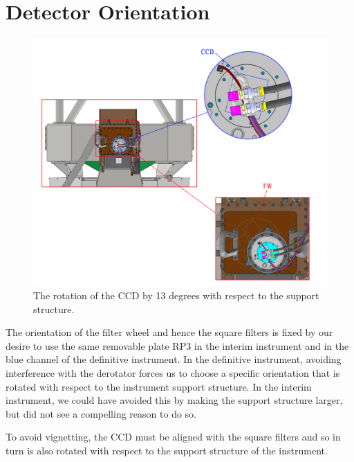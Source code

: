 \documentclass{article}
\begin{document}

\clearpage
\section{Detector Orientation}

\begin{figure}[bp]
\begin{center}
\includegraphics[width=\linewidth]{newfigures/CCD-Orientation.png}
\end{center}
\caption{The rotation of the CCD by 13 degrees with respect to the support structure.}
\label{figure:ccd-rotation}
\end{figure}

The orientation of the filter wheel and hence the square filters is fixed by our desire to use the same removable plate RP3 in the interim instrument and in the blue channel of the definitive instrument. In the definitive instrument, avoiding interference with the derotator forces us to choose a specific orientation that is rotated with respect to the instrument support structure. In the interim instrument, we could have avoided this by making the support structure larger, but did not see a compelling reason to do so.

To avoid vignetting, the CCD must be aligned with the square filters and so in turn is also rotated with respect to the support structure of the instrument.
\end{document}
